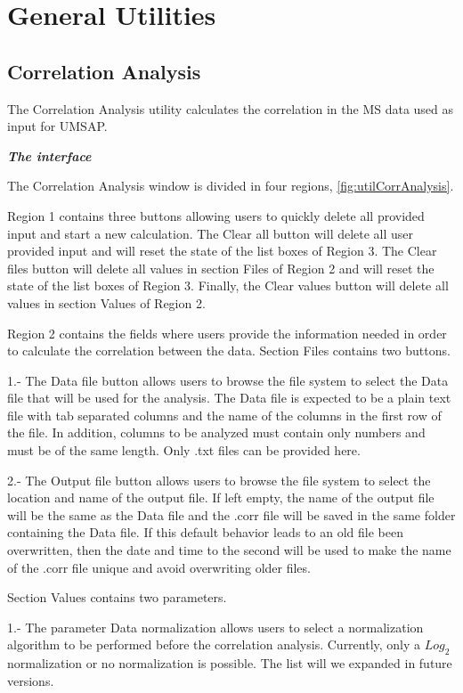 \section{General Utilities}

\subsection{Correlation Analysis}

The Correlation Analysis utility calculates the correlation in the MS data used as input for UMSAP.

\textit{\textbf{The interface}}

The Correlation Analysis window is divided in four regions, \autoref{fig:utilCorrAnalysis}. 

Region \num{1} contains three buttons allowing users to quickly delete all provided input and start a new calculation. The Clear all button will delete all user provided input and will reset the state of the list boxes of Region \num{3}. The Clear files button will delete all values in section Files of Region \num{2} and will reset the state of the list boxes of Region \num{3}. Finally, the Clear values button will delete all values in section Values of Region \num{2}.

Region \num{2} contains the fields where users provide the information needed in order to calculate the correlation between the data. Section Files contains two buttons.

\num{1}.- The Data file button allows users to browse the file system to select the Data file that will be used for the analysis. The Data file is expected to be a plain text file with tab separated columns and the name of the columns in the first row of the file. In addition, columns to be analyzed must contain only numbers and must be of the same length. Only .txt files can be provided here. 

\num{2}.- The Output file button allows users to browse the file system to select the location and name of the output file. If left empty, the name of the output file will be the same as the Data file and the .corr file will be saved in the same folder containing the Data file. If this default behavior leads to an old file been overwritten, then the date and time to the second will be used to make the name of the .corr file unique and avoid overwriting older files. 

Section Values contains two parameters.

\num{1}.- The parameter Data normalization allows users to select a normalization algorithm to be performed before the correlation analysis. Currently, only a $Log_{2}$ normalization or no normalization is possible. The list will we expanded in future versions. 


